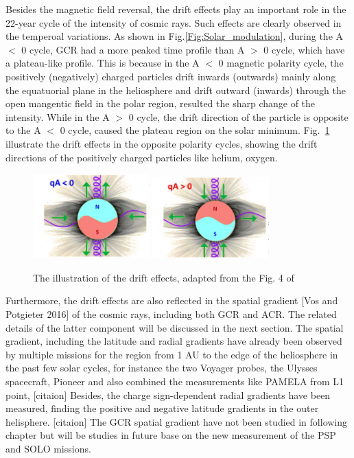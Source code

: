 Besides the magnetic field reversal, the drift effects play an important role in the 22-year cycle of the intensity of cosmic rays. Such effects are clearly observed in the temperoal variations.
As shown in Fig.\ref{Fig:Solar_modulation}, during the A $<$ 0 cycle, GCR had a more peaked time profile than A $>$ 0 cycle, which have a plateau-like profile. 
This is because in the A $<$ 0 magnetic polarity cycle, the positively (negatively) charged particles drift inwards (outwards) mainly along the equatuorial plane in the heliosphere and drift outward (inwards) through the open mangentic field in the polar region, resulted the sharp change of the intensity. While in the A $>$ 0 cycle, the drift direction of the particle is opposite to the A $<$ 0 cycle, caused the plateau region on the solar minimum. Fig.~\ref{Fig:drift_effect} illustrate the drift effects in the opposite polarity cycles, showing the drift directions of the positively charged particles like helium, oxygen.

\begin{figure}
	\centering
	\includegraphics[width = 0.4\textwidth]{images/drift_effect.png}
	\includegraphics[width = 0.4\textwidth]{images/drift_effect_2.png}
	\caption{The illustration of the drift effects, adapted from the Fig. 4 of \citep{Rankin2022ApJ}}
	\label{Fig:drift_effect}	
\end{figure}

Furthermore, the drift effects are also reflected in the spatial gradient [Vos and Potgieter 2016] of the cosmic rays, including both \ac{GCR} and \ac{ACR}. The related details of the latter component will be discussed in the next section. 
The spatial gradient, including the latitude and radial gradients have already been observed by multiple missions for the region from 1 AU to the edge of the heliosphere in the past few solar cycles, for instance the two Voyager probes, the Ulysses spacecraft, Pioneer and also combined the measurements like PAMELA from L1 point, [citaion]
Besides, the charge sign-dependent radial gradients have been measured, finding the positive and negative latitude gradients in the outer helisphere. [citaion]
The GCR spatial gradient have not been studied in following chapter but will be studies in future base on the new measurement of the PSP and SOLO missions. 


